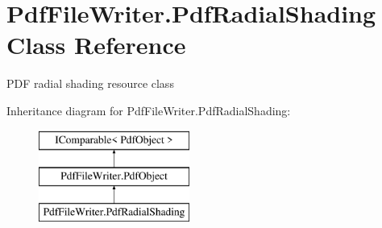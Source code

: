 \hypertarget{class_pdf_file_writer_1_1_pdf_radial_shading}{}\section{Pdf\+File\+Writer.\+Pdf\+Radial\+Shading Class Reference}
\label{class_pdf_file_writer_1_1_pdf_radial_shading}


P\+DF radial shading resource class  


Inheritance diagram for Pdf\+File\+Writer.\+Pdf\+Radial\+Shading\+:\begin{figure}[H]
\begin{center}
\leavevmode
\includegraphics[height=3.000000cm]{class_pdf_file_writer_1_1_pdf_radial_shading}
\end{center}
\end{figure}
